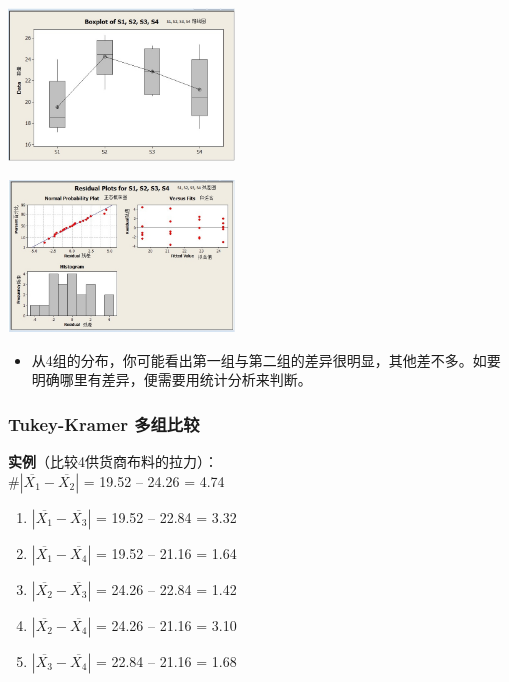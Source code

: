 
\includegraphics[width=6cm]{AnovaBoxplots807-1.jpg}


\includegraphics[width=6cm]{Anova3inOneScreenshot_2022-08-07_125131-1.jpg}

\begin{itemize}
\tightlist
\item
  从4组的分布，你可能看出第一组与第二组的差异很明显，其他差不多。如要明确哪里有差异，便需要用统计分析来判断。
\end{itemize}

\hypertarget{tukey-kramer-ux591aux7ec4ux6bd4ux8f83}{%
\subsubsection{Tukey-Kramer
多组比较}\label{tukey-kramer-ux591aux7ec4ux6bd4ux8f83}}

\textbf{实例}（比较4供货商布料的拉力）：\\
\#\(|\overline{X_1} - \overline{X_2} |\) = \textbar{}19.52 --
24.26\textbar{} = 4.74

\begin{enumerate}
\tightlist
\item
  \(|\overline{X_1} - \overline{X_3} |\) = \textbar{}19.52 --
  22.84\textbar{} = 3.32
\item
  \(|\overline{X_1} - \overline{X_4} |\) = \textbar{}19.52 --
  21.16\textbar{} = 1.64
\item
  \(|\overline{X_2} - \overline{X_3} |\) = \textbar{}24.26 --
  22.84\textbar{} = 1.42
\item
  \(|\overline{X_2} - \overline{X_4} |\) = \textbar{}24.26 --
  21.16\textbar{} = 3.10
\item
  \(|\overline{X_3} - \overline{X_4} |\) = \textbar{}22.84 --
  21.16\textbar{} = 1.68
\end{enumerate}

